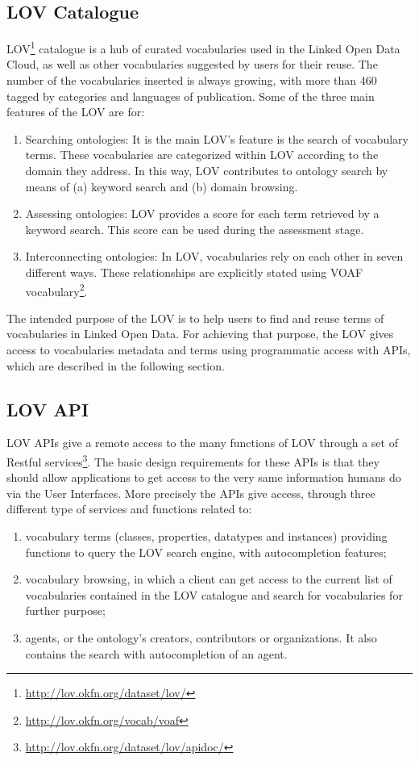 \subsection{LOV Catalogue} 
LOV\footnote{\url{http://lov.okfn.org/dataset/lov/}} catalogue \cite{vandenbusschelov} is a hub of curated vocabularies used in the Linked Open Data Cloud, as well as other vocabularies suggested by users for their reuse. The number of the vocabularies inserted is always growing, with more than 460 tagged by categories and languages of publication. Some of the three main features of the LOV are for:
\begin{enumerate}
\item Searching ontologies: It is the main LOV's feature is the search of vocabulary terms. These vocabularies are categorized within LOV according to the domain they address. In this way, LOV contributes to ontology search by means of (a) keyword search and (b) domain browsing.
 \item Assessing ontologies: LOV provides a score for each term retrieved by a keyword search. This score can be used during the assessment stage.
 \item Interconnecting ontologies: In LOV, vocabularies rely on each other in seven different ways. These relationships are explicitly stated using VOAF vocabulary\footnote{\url{http://lov.okfn.org/vocab/voaf}}. 
\end{enumerate}

The intended purpose of the LOV is to help users to find and reuse terms of vocabularies in Linked Open Data. For achieving that purpose, the LOV gives access to vocabularies metadata and terms using programmatic access with APIs, which are described in the following section.  

\subsection{LOV API}
LOV APIs give a remote access to the many functions of LOV through a set of Restful services\footnote{\url{http://lov.okfn.org/dataset/lov/apidoc/}}. The basic design requirements for these APIs is that they should allow applications to get access to the very same information humans do via the User Interfaces. More precisely the APIs give access, through three different type of services and functions related to:
\begin{enumerate} 
	\item vocabulary terms (classes, properties, datatypes and instances) providing functions to query the LOV search engine, with autocompletion features;
	\item vocabulary browsing, in which a client can get access to the current list of vocabularies contained in the LOV catalogue and search for vocabularies for further purpose;
	\item agents, or the ontology's creators, contributors or organizations. It also contains the search with autocompletion of an agent.
	\end{enumerate}


